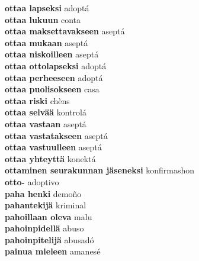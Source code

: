 \textbf{ ottaa lapseksi  } adoptá \\
\textbf{ ottaa lukuun  } conta \\
\textbf{ ottaa maksettavakseen  } aseptá \\
\textbf{ ottaa mukaan  } aseptá \\
\textbf{ ottaa niskoilleen  } aseptá \\
\textbf{ ottaa ottolapseksi  } adoptá \\
\textbf{ ottaa perheeseen  } adoptá \\
\textbf{ ottaa puolisokseen  } casa \\
\textbf{ ottaa riski  } chèns \\
\textbf{ ottaa selvää  } kontrolá \\
\textbf{ ottaa vastaan  } aseptá \\
\textbf{ ottaa vastatakseen  } aseptá \\
\textbf{ ottaa vastuulleen  } aseptá \\
\textbf{ ottaa yhteyttä  } konektá \\
\textbf{ ottaminen seurakunnan jäseneksi  } konfirmashon \\
\textbf{ otto-  } adoptivo \\
\textbf{ paha henki  } demoño \\
\textbf{ pahantekijä  } kriminal \\
\textbf{ pahoillaan oleva  } malu \\
\textbf{ pahoinpidellä  } abuso \\
\textbf{ pahoinpitelijä  } abusadó \\
\textbf{ painua mieleen  } amanesé \\
